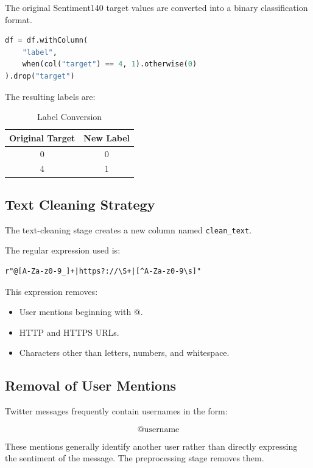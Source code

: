 \documentclass[12pt,a4paper]{article}
\begin{document}
The original Sentiment140 target values are converted into a binary classification format.

\begin{lstlisting}[language=Python]
df = df.withColumn(
    "label",
    when(col("target") == 4, 1).otherwise(0)
).drop("target")
\end{lstlisting}

The resulting labels are:

\begin{table}[H]
\centering
\caption{Label Conversion}
\begin{tabular}{cc}
\toprule
\textbf{Original Target} & \textbf{New Label} \\
\midrule
0 & 0 \\
4 & 1 \\
\bottomrule
\end{tabular}
\end{table}

\subsection{Text Cleaning Strategy}

The text-cleaning stage creates a new column named \texttt{clean\_text}.

The regular expression used is:

\begin{lstlisting}
r"@[A-Za-z0-9_]+|https?://\S+|[^A-Za-z0-9\s]"
\end{lstlisting}

This expression removes:

\begin{itemize}
    \item User mentions beginning with @.
    \item HTTP and HTTPS URLs.
    \item Characters other than letters, numbers, and whitespace.
\end{itemize}

\subsection{Removal of User Mentions}

Twitter messages frequently contain usernames in the form:

\[
@\text{username}
\]

These mentions generally identify another user rather than directly expressing the sentiment of the message. The preprocessing stage removes them.
\end{document}
